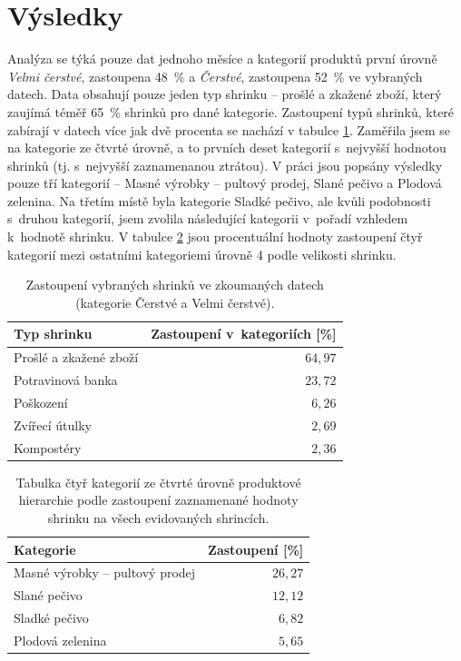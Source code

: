 \section{Výsledky}

Analýza se týká pouze dat jednoho měsíce a kategorií produktů první úrovně \emph{Velmi čerstvé}, zastoupena 48~\% a \emph{Čerstvé}, zastoupena 52~\% ve vybraných datech. Data obsahují pouze jeden typ shrinku -- prošlé a zkažené zboží, který zaujímá téměř 65~\% shrinků pro dané kategorie. Zastoupení typů shrinků, které zabírají v datech více jak dvě procenta se nachází v tabulce \ref*{tab:shrinkyZastoupeni}.
Zaměřila jsem se na kategorie ze čtvrté úrovně, a to prvních deset kategorií s~nejvyšší hodnotou shrinků (tj. s~nejvyšší zaznamenanou ztrátou). V práci jsou popsány výsledky pouze tří kategorií -- Masné výrobky -- pultový prodej, Slané pečivo a Plodová zelenina. Na třetím místě byla kategorie Sladké pečivo, ale kvůli podobnosti s~druhou kategorií, jsem zvolila následující kategorii v~pořadí vzhledem k~hodnotě shrinku.
V tabulce \ref*{tab:lostcost4} jsou procentuální hodnoty zastoupení čtyř kategorií mezi ostatními kategoriemi úrovně 4 podle velikosti shrinku. 

\begin{table}[h!]
    \begin{center}
            \captionsetup{justification=centering}
    \caption{Zastoupení vybraných shrinků ve zkoumaných datech \\(kategorie Čerstvé a Velmi čerstvé).}
    \begin{tabular}{l r}
        Typ shrinku & Zastoupení v~kategoriích [\%]\\
        \midrule
        Prošlé a zkažené zboží & $64{,}97$ \\
        Potravinová banka & $23{,}72$ \\
        Poškození & $6{,}26$ \\
        Zvířecí útulky & $2{,}69$ \\
        Kompostéry &  $2{,}36$ \\
        \end{tabular}
    \label{tab:shrinkyZastoupeni}
\end{center}
\end{table}

\begin{table}[h!]
    \centering
    \captionsetup{justification=centering}
    \caption{Tabulka čtyř kategorií ze čtvrté úrovně produktové hierarchie podle zastoupení zaznamenané hodnoty shrinku na všech evidovaných shrincích.}
    \begin{tabular}{l r}
        Kategorie & Zastoupení [\%] \\

    \hline
    Masné výrobky -- pultový prodej &$ 26{,}27$ \\
    Slané pečivo&  $12{,}12$\\
    Sladké pečivo&   $6{,}82$\\
    Plodová zelenina&   $5{,}65$\\
    \end{tabular}
    \label{tab:lostcost4}
    \end{table}

